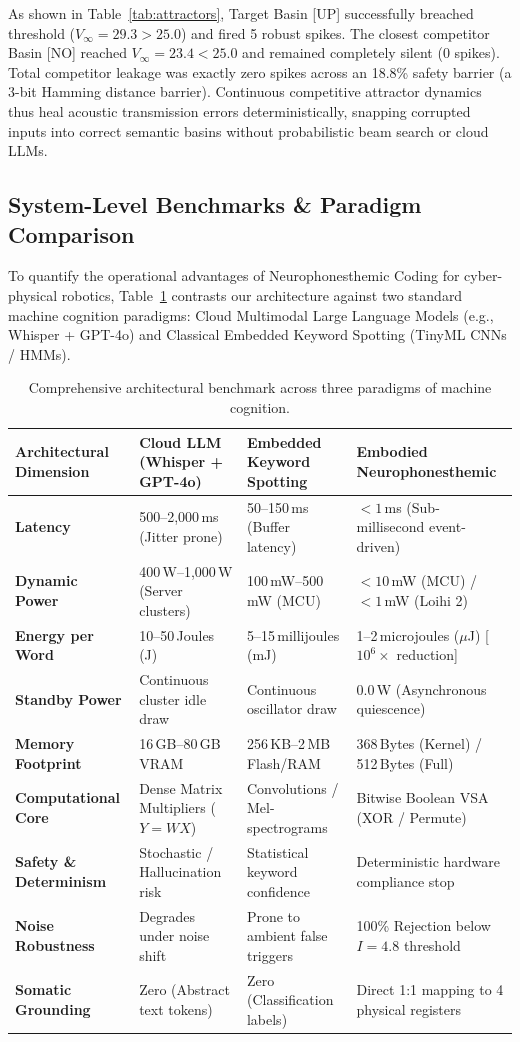 \documentclass[journal,twocolumn]{IEEEtran}
\begin{document}
As shown in Table~\ref{tab:attractors}, Target Basin [UP] successfully breached threshold ($V_\infty = 29.3 > 25.0$) and fired 5 robust spikes. The closest competitor Basin [NO] reached $V_\infty = 23.4 < 25.0$ and remained completely silent (0 spikes). Total competitor leakage was exactly zero spikes across an 18.8\% safety barrier (a 3-bit Hamming distance barrier). Continuous competitive attractor dynamics thus heal acoustic transmission errors deterministically, snapping corrupted inputs into correct semantic basins without probabilistic beam search or cloud LLMs.

\subsection{System-Level Benchmarks \& Paradigm Comparison}
To quantify the operational advantages of Neurophonesthemic Coding for cyber-physical robotics, Table~\ref{tab:benchmarks} contrasts our architecture against two standard machine cognition paradigms: Cloud Multimodal Large Language Models (e.g., Whisper + GPT-4o) and Classical Embedded Keyword Spotting (TinyML CNNs / HMMs).

\begin{table}[t]
\centering
\caption{Comprehensive architectural benchmark across three paradigms of machine cognition.}
\label{tab:benchmarks}
\begin{tabular}{llll}
\toprule
\textbf{Architectural Dimension} & \textbf{Cloud LLM (Whisper + GPT-4o)} & \textbf{Embedded Keyword Spotting} & \textbf{Embodied Neurophonesthemic} \\
\midrule
\textbf{Latency} & 500--2,000\,ms (Jitter prone) & 50--150\,ms (Buffer latency) & $< 1$\,ms (Sub-millisecond event-driven) \\
\textbf{Dynamic Power} & 400\,W--1,000\,W (Server clusters) & 100\,mW--500\,mW (MCU) & $< 10$\,mW (MCU) / $< 1$\,mW (Loihi 2) \\
\textbf{Energy per Word} & 10--50\,Joules (J) & 5--15\,millijoules (mJ) & 1--2\,microjoules ($\mu$J) [$10^6\times$ reduction] \\
\textbf{Standby Power} & Continuous cluster idle draw & Continuous oscillator draw & 0.0\,W (Asynchronous quiescence) \\
\textbf{Memory Footprint} & 16\,GB--80\,GB VRAM & 256\,KB--2\,MB Flash/RAM & 368\,Bytes (Kernel) / 512\,Bytes (Full) \\
\textbf{Computational Core} & Dense Matrix Multipliers ($Y=WX$) & Convolutions / Mel-spectrograms & Bitwise Boolean VSA (XOR / Permute) \\
\textbf{Safety \& Determinism} & Stochastic / Hallucination risk & Statistical keyword confidence & Deterministic hardware compliance stop \\
\textbf{Noise Robustness} & Degrades under noise shift & Prone to ambient false triggers & 100\% Rejection below $I = 4.8$ threshold \\
\textbf{Somatic Grounding} & Zero (Abstract text tokens) & Zero (Classification labels) & Direct 1:1 mapping to 4 physical registers \\
\bottomrule
\end{tabular}
\end{table}
\end{document}
